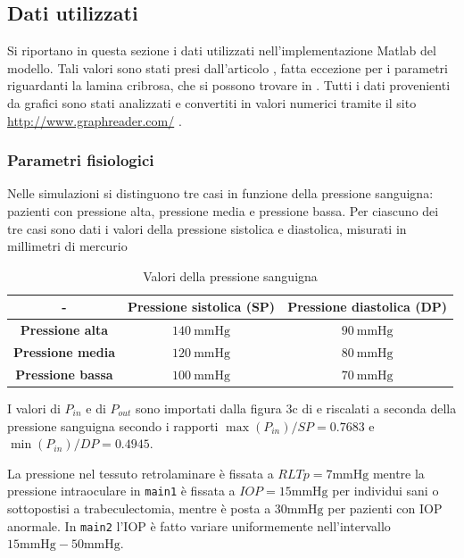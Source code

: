 \documentclass{article}
\begin{document}
\subsection{Dati utilizzati}
Si riportano in questa sezione i dati utilizzati nell'implementazione Matlab del modello.
Tali valori sono stati presi dall'articolo \citep{art1}, fatta eccezione per i parametri riguardanti la lamina cribrosa, che si possono trovare in \cite{art3}.
Tutti i dati provenienti da grafici sono stati analizzati e convertiti in valori numerici tramite il sito \url{http://www.graphreader.com/} \cite{ricalca}.

\subsubsection*{Parametri fisiologici}
Nelle simulazioni si distinguono tre casi in funzione della pressione sanguigna: pazienti con pressione alta, pressione media e pressione bassa.
Per ciascuno dei tre casi sono dati i valori della pressione sistolica e diastolica, misurati in millimetri di mercurio
\begin{table}[h!]
\begin{center}
\begin{tabular}{| c | c | c |}
\hline
 - & \textbf{Pressione sistolica (SP)} & \textbf{Pressione diastolica (DP)}\\
\hline
\textbf{Pressione alta} & $140\ \si{\mmHg}$ & $90\ \si{\mmHg}$\\
\textbf{Pressione media} & $120\ \si{\mmHg}$ & $80\ \si{\mmHg}$\\
\textbf{Pressione bassa} & $100\ \si{\mmHg}$ & $70\ \si{\mmHg}$\\
\hline
\end{tabular}
\caption{Valori della pressione sanguigna}
\label{tab_pressione}
\end{center}
\end{table}

I valori di $P_{in}$ e di $P_{out}$ sono importati dalla figura 3c di \cite{art1} e riscalati a seconda della pressione sanguigna secondo i rapporti $\max(P_{in}) / SP = 0.7683$ e $\min(P_{in}) / DP = 0.4945$.

La pressione nel tessuto retrolaminare è fissata a $RLTp = 7 \si{\mmHg}$ mentre la pressione intraoculare in \texttt{main1} è fissata a $IOP = 15 \si{\mmHg}$ per individui sani o sottopostisi a trabeculectomia, mentre è posta a $30 \si{\mmHg}$ per pazienti con IOP anormale.
In \texttt{main2} l'IOP è fatto variare uniformemente nell'intervallo $15 \si{\mmHg} - 50 \si{\mmHg}$.
\end{document}
